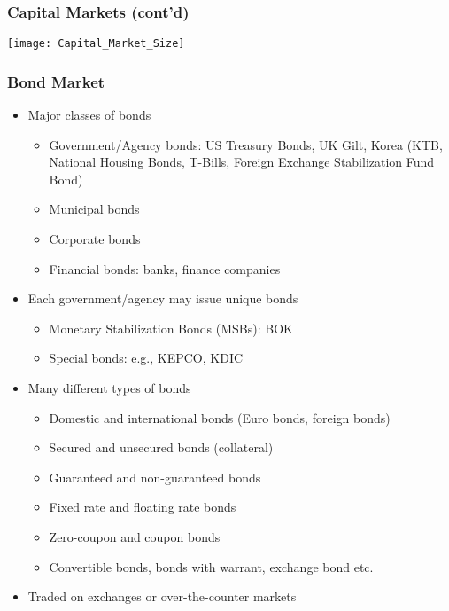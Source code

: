\documentclass[10pt]{beamer}
\begin{document}
	
	
	\begin{frame}
		\frametitle{Capital Markets (cont'd)} \vspace{-10pt}
		\begin{center}
			\texttt{[image: Capital\_Market\_Size]}
		\end{center}
		
	\end{frame}	
	
	
	\begin{frame}
		\frametitle{Bond Market}
		
		\begin{itemize}
			\item Major classes of bonds
			\begin{itemize}
				\item Government/Agency bonds: US Treasury Bonds, UK Gilt, Korea (KTB, National Housing Bonds, T-Bills, Foreign Exchange Stabilization Fund Bond)
				\item Municipal bonds
				\item Corporate bonds
				\item Financial bonds: banks, finance companies		
			\end{itemize}	
			
			\item Each government/agency may issue unique bonds
			\begin{itemize}
				\item Monetary Stabilization Bonds (MSBs): BOK		
				\item Special bonds: e.g., KEPCO, KDIC %
			\end{itemize}
			
			\item Many different types of bonds
			\begin{itemize}
				\item Domestic and international bonds (Euro bonds, foreign bonds)
				\item Secured and unsecured bonds (collateral)
				\item Guaranteed and non-guaranteed bonds
				\item Fixed rate and floating rate bonds
				\item Zero-coupon and coupon bonds
				\item Convertible bonds, bonds with warrant, exchange bond etc.
			\end{itemize}
			\item Traded on exchanges or over-the-counter markets
			
		\end{itemize}
		
	\end{frame}
	
\end{document}
